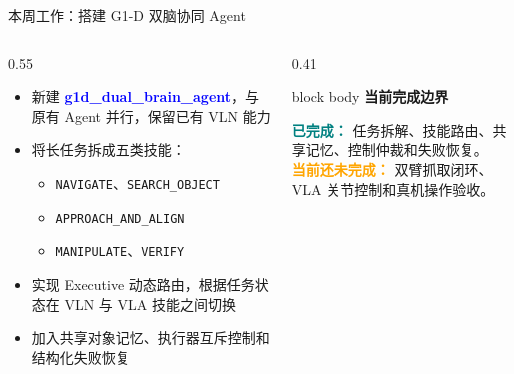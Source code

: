 \documentclass[aspectratio=169,11pt]{beamer}
\newcommand{\key}[1]{\textcolor{blue}{\textbf{#1}}}
\begin{document}
\begin{frame}{本周工作：搭建 G1-D 双脑协同 Agent}
  \begin{columns}[T,onlytextwidth]
    \begin{column}{0.55\textwidth}
      \begin{itemize}
        \setlength{\itemsep}{0.65em}
        \item 新建 \key{g1d\_dual\_brain\_agent}，与原有 Agent 并行，保留已有 VLN 能力
        \item 将长任务拆成五类技能：
          \begin{itemize}
            \item \texttt{NAVIGATE}、\texttt{SEARCH\_OBJECT}
            \item \texttt{APPROACH\_AND\_ALIGN}
            \item \texttt{MANIPULATE}、\texttt{VERIFY}
          \end{itemize}
        \item 实现 Executive 动态路由，根据任务状态在 VLN 与 VLA 技能之间切换
        \item 加入共享对象记忆、执行器互斥控制和结构化失败恢复
      \end{itemize}
    \end{column}
    \begin{column}{0.41\textwidth}
      \begin{beamercolorbox}[rounded=true,sep=0.9em]{block body}
        \centering
        {\Large\color{navy}\textbf{当前完成边界}}\\[0.7em]
        \raggedright
        \textcolor{teal}{\textbf{已完成：}}
        任务拆解、技能路由、共享记忆、控制仲裁和失败恢复。\\[0.8em]
        \textcolor{orange}{\textbf{当前还未完成：}}
        双臂抓取闭环、VLA 关节控制和真机操作验收。
      \end{beamercolorbox}
    \end{column}
  \end{columns}
\end{frame}
\end{document}
